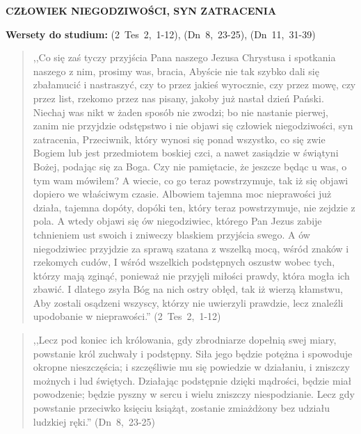 \documentclass[10pt,a4paper,oneside]{article}
\begin{document}
\centerline{\textbf{\MakeUppercase{Człowiek niegodziwości, syn zatracenia}}}
\begin{center}
\textbf{Wersety do studium:} \mbox{(2 Tes 2, 1-12)}, \mbox{(Dn 8, 23-25)}, \mbox{(Dn 11, 31-39)}
\end{center}
\begin{quote}
,,Co się zaś tyczy przyjścia Pana naszego Jezusa Chrystusa i spotkania naszego z nim, prosimy was, bracia, Abyście nie tak szybko dali się zbałamucić i nastraszyć, czy to przez jakieś wyrocznie, czy przez mowę, czy przez list, rzekomo przez nas pisany, jakoby już nastał dzień Pański. Niechaj was nikt w żaden sposób nie zwodzi; bo nie nastanie pierwej, zanim nie przyjdzie odstępstwo i nie objawi się człowiek niegodziwości, syn zatracenia, Przeciwnik, który wynosi się ponad wszystko, co się zwie Bogiem lub jest przedmiotem boskiej czci, a nawet zasiądzie w świątyni Bożej, podając się za Boga. Czy nie pamiętacie, że jeszcze będąc u was, o tym wam mówiłem? A wiecie, co go teraz powstrzymuje, tak iż się objawi dopiero we właściwym czasie. Albowiem tajemna moc nieprawości już działa, tajemna dopóty, dopóki ten, który teraz powstrzymuje, nie zejdzie z pola. A wtedy objawi się ów niegodziwiec, którego Pan Jezus zabije tchnieniem ust swoich i zniweczy blaskiem przyjścia swego. A ów niegodziwiec przyjdzie za sprawą szatana z wszelką mocą, wśród znaków i rzekomych cudów, I wśród wszelkich podstępnych oszustw wobec tych, którzy mają zginąć, ponieważ nie przyjęli miłości prawdy, która mogła ich zbawić. I dlatego zsyła Bóg na nich ostry obłęd, tak iż wierzą kłamstwu, Aby zostali osądzeni wszyscy, którzy nie uwierzyli prawdzie, lecz znaleźli upodobanie w nieprawości.'' \mbox{(2 Tes 2, 1-12)}
\end{quote}
\begin{quote}
,,Lecz pod koniec ich królowania, gdy zbrodniarze dopełnią swej miary, powstanie król zuchwały i podstępny. Siła jego będzie potężna i spowoduje okropne nieszczęścia; i szczęśliwie mu się powiedzie w działaniu, i zniszczy możnych i lud świętych. Działając podstępnie dzięki mądrości, będzie miał powodzenie; będzie pyszny w sercu i wielu zniszczy niespodzianie. Lecz gdy powstanie przeciwko księciu książąt, zostanie zmiażdżony bez udziału ludzkiej ręki.'' \mbox{(Dn 8, 23-25)}
\end{quote}
\end{document}
